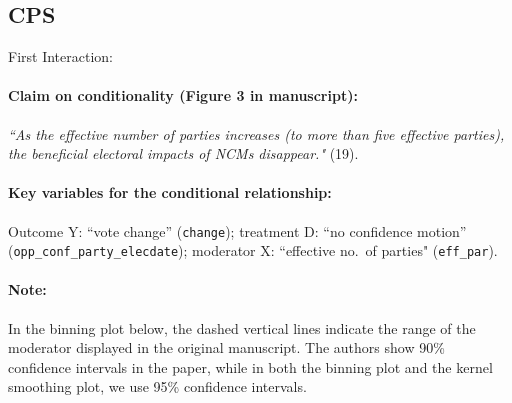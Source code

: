 \documentclass[12pt]{article}
\begin{document}
\clearpage


\subsection{\citet{Williams2011} CPS} \label{williams}

\noindent First Interaction:

\paragraph{Claim on conditionality (Figure 3 in manuscript):}
\emph{``As the effective number of parties increases (to more than
  five effective parties), the beneficial electoral impacts of NCMs
  disappear."} (19).

\paragraph{Key variables for the conditional relationship:} Outcome Y:
``vote change'' (\texttt{change}); treatment D: ``no confidence
motion'' (\texttt{opp\_conf\_party\_elecdate}); moderator X:
``effective no.\ of parties" (\texttt{eff\_par}).

\paragraph{Note:} In the binning plot below, the dashed vertical lines
indicate the range of the moderator displayed in the original
manuscript. The authors show 90\% confidence intervals in the paper, while in both the binning plot and the kernel smoothing plot, we use 95\% confidence intervals.


\newpage
\end{document}
